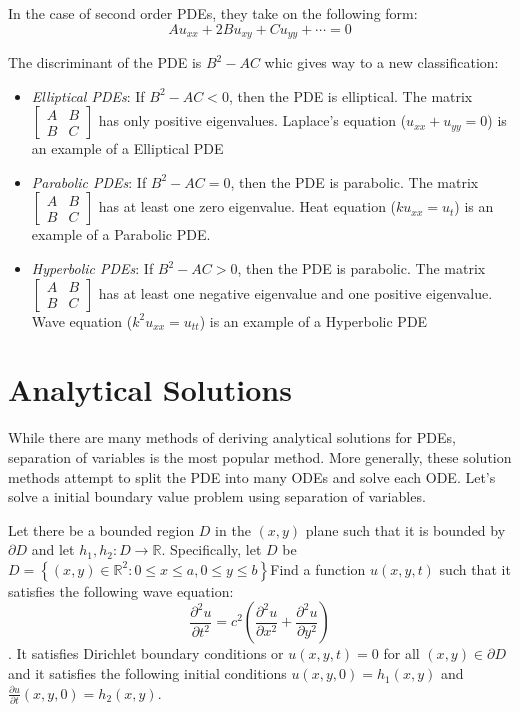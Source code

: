 \documentclass[12pt]{article}
\begin{document}
In the case of second order PDEs, they take on the following form:
$$Au_{xx} + 2Bu_{xy} + Cu_{yy} + \cdots = 0$$

The discriminant of the PDE is $B^2 - AC$ whic gives way to a new classification:
\begin{itemize}
    \item \textit{Elliptical PDEs}: If $B^2 - AC < 0$, then the PDE is elliptical. The matrix $\begin{bmatrix}
        A & B \\
        B & C
    \end{bmatrix}$ has only positive eigenvalues. Laplace's equation ($u_{xx} + u_{yy} = 0$) is an example of a Elliptical PDE
    \item \textit{Parabolic PDEs}: If $B^2 - AC = 0$, then the PDE is parabolic. The matrix $\begin{bmatrix}
        A & B \\
        B & C
    \end{bmatrix}$ has at least one zero eigenvalue. Heat equation ($ku_{xx} = u_{t}$) is an example of a Parabolic PDE.
    \item \textit{Hyperbolic PDEs}: If $B^2 - AC > 0$, then the PDE is parabolic. The matrix $\begin{bmatrix}
        A & B \\
        B & C
    \end{bmatrix}$ has at least one negative eigenvalue and one positive eigenvalue. Wave equation ($k^2u_{xx} = u_{tt}$) is an example of a Hyperbolic PDE
\end{itemize}


\section{Analytical Solutions}

While there are many methods of deriving analytical solutions for PDEs, separation of variables is the most popular method. More generally, these solution methods attempt to split the PDE into many ODEs and solve each ODE. Let's solve a initial boundary value problem using separation of variables. 

Let there be a bounded region $D$ in the $(x, y)$ plane such that it is bounded by $\partial D$ and let $h_1, h_2 : D \to \mathbb{R}$. Specifically, let $D$ be $D = \left\{(x, y) \in \mathbb{R}^2: 0 \leq x \leq a, 0 \leq y \leq b\right\}$Find a function $u(x, y, t)$ such that it satisfies the following wave equation:
$$\frac{\partial^2 u}{\partial t^2} = c^2\left(\frac{\partial^2u}{\partial x^2} + \frac{\partial^2u}{\partial y^2}\right)$$.
It satisfies Dirichlet boundary conditions or $u(x, y, t) = 0$ for all $(x, y) \in \partial D$ and it satisfies the following initial conditions $u(x, y, 0) = h_1(x, y)$ and $\frac{\partial u}{\partial t}(x, y, 0) = h_2(x, y)$. 
\end{document}
